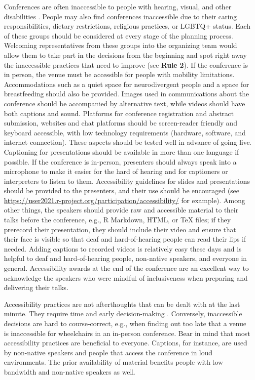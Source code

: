 \documentclass[10pt,letterpaper]{article}
\begin{document}
Conferences are often inaccessible to people with hearing, visual, and other disabilities \cite{price_access_2009}. People may also find conferences inaccessible due to their caring responsibilities, dietary restrictions, religious practices, or LGBTQ+ status. Each of these groups should be considered at every stage of the planning process. Welcoming representatives from these groups into the organizing team would allow them to take part in the decisions from the beginning and spot right away the inaccessible practices that need to improve (see \textbf{Rule 2}). If the conference is in person, the venue must be accessible for people with mobility limitations. Accommodations such as a quiet space for neurodivergent people and a space for breastfeeding should also be provided. Images used in communications about the conference should be accompanied by alternative text, while videos should have both captions and sound. Platforms for conference registration and abstract submission, websites and chat platforms should be screen-reader friendly and keyboard accessible, with low technology requirements (hardware, software, and internet connection). These aspects should be tested well in advance of going live. Captioning for presentations should be available in more than one language if possible. If the conference is in-person, presenters should always speak into a microphone to make it easier for the hard of hearing and for captioners or interpreters to listen to them. Accessibility guidelines for slides and presentations should be provided to the presenters, and their use should be encouraged (see \url{https://user2021.r-project.org/participation/accessibility/} for example). Among other things, the speakers should provide raw and accessible material to their talks before the conference, e.g., R Markdown, HTML, or \TeX{} files; if they prerecord their presentation, they should include their video and ensure that their face is visible so that deaf and hard-of-hearing people can read their lips if needed. Adding captions to recorded videos is relatively easy these days and is helpful to deaf and hard-of-hearing people, non-native speakers, and everyone in general.  Accessibility awards at the end of the conference are an excellent way to acknowledge the speakers who were mindful of inclusiveness when preparing and delivering their talks. 

Accessibility practices are not afterthoughts that can be dealt with at the last minute. They require time and early decision-making \cite{irish_increasing_2020}. Conversely, inaccessible decisions are hard to course-correct, e.g., when finding out too late that a venue is inaccessible for wheelchairs in an in-person conference. 
Bear in mind that most accessibility practices are beneficial to everyone. Captions, for instance, are used by non-native speakers and people that access the conference in loud environments. The prior availability of material benefits people with low bandwidth and non-native speakers as well.
\end{document}
